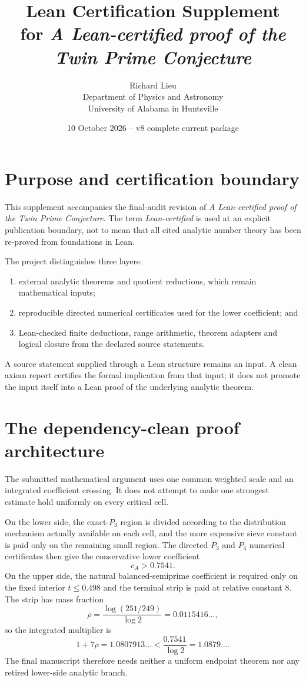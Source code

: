 \documentclass[11pt]{article}
\title{Lean Certification Supplement\\\large for \emph{A Lean-certified proof of the Twin Prime Conjecture}}
\author{Richard Lieu\\Department of Physics and Astronomy\\University of Alabama in Huntsville}
\date{10 October 2026 -- v8 complete current package}
\begin{document}
\maketitle

\section{Purpose and certification boundary}
This supplement accompanies the final-audit revision of \emph{A Lean-certified proof of the Twin Prime Conjecture}.  The term \emph{Lean-certified} is used at an explicit publication boundary, not to mean that all cited analytic number theory has been re-proved from foundations in Lean.

The project distinguishes three layers:
\begin{enumerate}[label=(\roman*),leftmargin=*]
\item external analytic theorems and quotient reductions, which remain mathematical inputs;
\item reproducible directed numerical certificates used for the lower coefficient; and
\item Lean-checked finite deductions, range arithmetic, theorem adapters and logical closure from the declared source statements.
\end{enumerate}
A source statement supplied through a Lean structure remains an input.  A clean axiom report certifies the formal implication from that input; it does not promote the input itself into a Lean proof of the underlying analytic theorem.

\section{The dependency-clean proof architecture}
The submitted mathematical argument uses one common weighted scale and an integrated coefficient crossing.  It does not attempt to make one strongest estimate hold uniformly on every critical cell.

On the lower side, the exact-$P_3$ region is divided according to the distribution mechanism actually available on each cell, and the more expensive sieve constant is paid only on the remaining small region.  The directed $P_3$ and $P_4$ numerical certificates then give the conservative lower coefficient
\[
 c_A>0.7541.
\]
On the upper side, the natural balanced-semiprime coefficient is required only on the fixed interior $t\le0.498$ and the terminal strip is paid at relative constant $8$.  The strip has mass fraction
\[
 \rho=\frac{\log(251/249)}{\log2}=0.0115416\ldots,
\]
so the integrated multiplier is
\[
 1+7\rho=1.0807913\ldots<\frac{0.7541}{\log2}=1.0879\ldots.
\]
The final manuscript therefore needs neither a uniform endpoint theorem nor any retired lower-side analytic branch.
\end{document}
